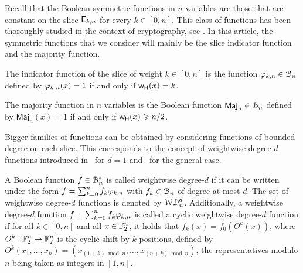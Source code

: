 \documentclass[11pt]{llncs}
\begin{document}
Recall that the Boolean symmetric functions in $n$ variables are those that are constant on the slice $\mathsf{E}_{k,n}$ for every $k\in [0,n]$. 
This class of functions has been thoroughly studied in the context of cryptography, see \eg{} \cite{IEEE:Carlet04,IEEE:CanVid05,INDO:BraPre05,DM:SarMai07,IEEE:QFLW09,IEEE:CheLu11,Latin:Meaux19,CCDS:Meaux21,IEEE:CarMea21}.
In this article, the symmetric functions that we consider will mainly be the slice indicator function and the majority function.
\begin{definition}\label{def:slice} The indicator function of the slice of weight $k\in[0,n]$ is the function $\varphi_{k,n}\in\mathcal{B}_n$ defined by $\varphi_{k,n}(x)=1$ if and only if $\mathsf{w_H}(x)=k$.
\end{definition}


\begin{definition}\label{def:maj}
    The majority function in $n$ variables is the Boolean function $\mathsf{Maj}_n\in\mathcal{B}_n$ defined by $\mathsf{Maj}_n(x)=1$ if and only if $\mathsf{w_H}(x)\geqslant n/2$.
\end{definition}

Bigger families of functions can be obtained by considering functions of bounded degree on each slice. This corresponds to the concept of weightwise degree-$d$ functions introduced in~\cite{DAM:GinMea22} for $d=1$ and~\cite{DAM:MeaOza24} for the general case. 

\begin{definition}\label{def:wwdegd}
    A Boolean function $f\in\mathcal{B}_n^*$ is called weightwise degree-$d$ if it can be written under the form $f=\sum_{k=0}^n f_k \varphi_{k,n}$ with $f_k\in\mathcal{B}_n$ of degree at most $d$. The set of weightwise degree-$d$ functions is denoted by $\mathcal{WD}^{d}_{n}$.
	Additionally, a weightwise degree-$d$ function $f=\sum_{k=0}^n f_k \varphi_{k,n}$ is called a cyclic weightwise degree-$d$ function if for all $k\in [0,n]$ and all $x\in\mathbb{F}_2^n$, it holds that $f_k(x)=f_0(O^k(x))$, where $O^k:\mathbb{F}_2^n\to\mathbb{F}_2^n$ is the cyclic shift by $k$ positions, defined by $O^k(x_1,\dots,x_n)=(x_{(1+k)\bmod n},\dots,x_{(n+k)\bmod n})$, the representatives modulo $n$ being taken as integers in $[1,n]$.
\end{definition}
\end{document}
